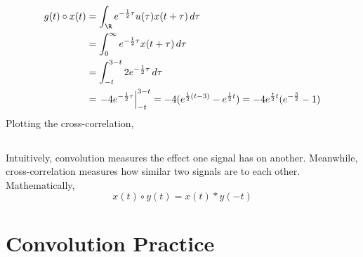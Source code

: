 \documentclass{article}
\begin{document}
\subsection{}

\begin{align}
    g(t) \circ x(t) &= \int_{\R} e^{-\frac{1}{2} \tau} u(\tau) x(t + \tau) \, d\tau \\
    &= \int_0^\infty e^{-\frac{1}{2} \tau} x(t + \tau) \, d\tau \\
    &= \int_{-t}^{3 - t} 2e^{-\frac{1}{2} \tau} \, d\tau \\
    &= \left.-4e^{-\frac{1}{2} \tau}\right|_{-t}^{3 - t} = -4(e^{\frac{1}{2} (t - 3)} - e^{\frac{1}{2} t}) = -4e^{\frac{t}{2} t} (e^{-\frac{3}{2}} - 1)
\end{align}
Plotting the cross-correlation,
\begin{center}
\end{center}

\subsection{}

Intuitively, convolution measures the effect one signal has on another.
Meanwhile, cross-correlation measures how similar two signals are to each other.
Mathematically,
\begin{equation}
    x(t) \circ y(t) = x(t) \ast y(-t)
\end{equation}

\section{Convolution Practice}

\subsection{}
\end{document}
